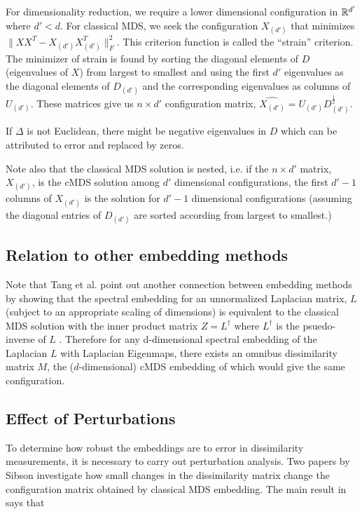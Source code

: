 \documentclass[12pt,oneside,final]{thesis}
\begin{document}
For dimensionality reduction, we require a lower dimensional configuration in $\mathbb{R}^{d'}$where $d'<d$. For classical MDS, we seek  the configuration $X_{(d')}$ that minimizes   $\|XX^T-X_{(d')}X_{(d')}^T\|_F^2$. This criterion function is called the ``strain'' criterion. The minimizer of strain is found by sorting the diagonal elements of $D$ (eigenvalues of $X$) from largest to smallest and  using the first $d'$ eigenvalues as the diagonal elements of  $D_{(d')}$ and the corresponding eigenvalues as columns of $U_{(d')}$. These matrices give us $n \times d'$ configuration matrix, $\hat{X_{(d')}}=U_{(d')}D_{(d')}^{\frac{1}{2}}$. 

If $\Delta$ is not Euclidean, there might be negative eigenvalues in $D$ which can be attributed to error and replaced by zeros.

Note also that the classical MDS solution  is nested, i.e. if the $n \times d'$ matrix, $X_{(d')}$,  is the cMDS solution among $d'$ dimensional configurations, the first $d'-1$ columns of $X_{(d')}$ is the solution for $d'-1$ dimensional configurations (assuming the diagonal entries of  $D_{(d')}$ are sorted according from largest to smallest.)


\subsection{Relation to other embedding methods\label{MDS_SpectralEmbed}}

Note that Tang et al.\cite{MinhTrosset_SpectralEmbed} point out another connection between embedding methods by showing that the spectral embedding for  an unnormalized Laplacian matrix, $L$ (subject to  an appropriate scaling of dimensions) is equivalent to the classical MDS solution with the inner product matrix $Z=L^{\dag}$ where $L^{\dag}$ is the psuedo-inverse of $L$ \cite{MinhTrosset_SpectralEmbed}. Therefore for any d-dimensional spectral embedding of the Laplacian $L$  with Laplacian Eigenmaps, there exists an omnibus dissimilarity matrix $M$, the ($d$-dimensional) cMDS embedding of which   would give the same configuration.


\subsection{Effect of Perturbations}
  To determine how robust the embeddings are to error in dissimilarity measurements, it is necessary to carry out perturbation analysis. Two papers by Sibson \cite{Sibson_perturbational1979} investigate how small changes in the dissimilarity matrix change the configuration matrix obtained by classical MDS embedding. The main result in  \cite{Sibson_perturbational1979} says that 
  
\end{document}
